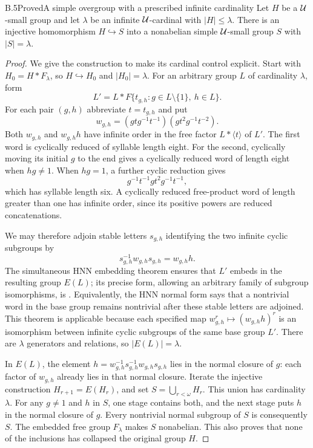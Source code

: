 \begin{claim}{B.5}{Proved}{A simple overgroup with a prescribed infinite cardinality}
Let $H$ be a $\mathcal U$-small group and let $\lambda$ be an infinite
$\mathcal U$-cardinal with $|H|\leq\lambda$.  There is an injective homomorphism
$H\hookrightarrow S$ into a nonabelian simple $\mathcal U$-small group $S$ with
$|S|=\lambda$.
\end{claim}
\begin{proof}
We give the construction to make its cardinal control explicit.  Start
with $H_0=H*F_\lambda$, so $H\hookrightarrow H_0$ and $|H_0|=\lambda$.
For an arbitrary group $L$ of cardinality $\lambda$, form
\[
 L'=L*F\{t_{g,h}:g\in L\setminus\{1\},\ h\in L\}.
\]
For each pair $(g,h)$ abbreviate $t=t_{g,h}$ and put
\[
 w_{g,h}=(gtg^{-1}t^{-1})(gt^2g^{-1}t^{-2}).
\]
Both $w_{g,h}$ and $w_{g,h}h$ have infinite order in the free factor
$L*\langle t\rangle$ of $L'$.  The first word is cyclically reduced of
syllable length eight.  For the second, cyclically moving its initial
$g$ to the end gives a cyclically reduced word of length eight when
$hg\ne1$.  When $hg=1$, a further cyclic reduction gives
\[
 g^{-1}t^{-1}gt^2g^{-1}t^{-1},
\]
which has syllable length six.  A cyclically reduced free-product word
of length greater than one has infinite order, since its positive powers
are reduced concatenations.

We may therefore adjoin stable letters $s_{g,h}$ identifying the two
infinite cyclic subgroups by
\[
 s_{g,h}^{-1}w_{g,h}s_{g,h}=w_{g,h}h.
\]
The simultaneous HNN embedding theorem ensures that $L'$ embeds in the
resulting group $E(L)$; its precise form, allowing an arbitrary family
of subgroup isomorphisms, is
\citet[Theorem~II]{BC_HNN1949}.  Equivalently, the HNN normal form says
that a nontrivial word in the base group remains nontrivial after these
stable letters are adjoined.  This theorem is applicable because each
specified map $w_{g,h}^r\mapsto(w_{g,h}h)^r$ is an isomorphism between
infinite cyclic subgroups of the same base group $L'$.  There are
$\lambda$ generators and relations, so $|E(L)|=\lambda$.

In $E(L)$, the element $h=w_{g,h}^{-1}s_{g,h}^{-1}w_{g,h}s_{g,h}$ lies
in the normal closure of $g$: each factor of $w_{g,h}$ already lies in
that normal closure.  Iterate the injective construction
$H_{r+1}=E(H_r)$, and set $S=\bigcup_{r<\omega}H_r$.  This union has
cardinality $\lambda$.  For any $g\ne1$ and $h$ in $S$, one stage
contains both, and the next stage puts $h$ in the normal closure of $g$.
Every nontrivial normal subgroup of $S$ is consequently $S$.  The
embedded free group $F_\lambda$ makes $S$ nonabelian.  This also proves
that none of the inclusions has collapsed the original group $H$.
\end{proof}

